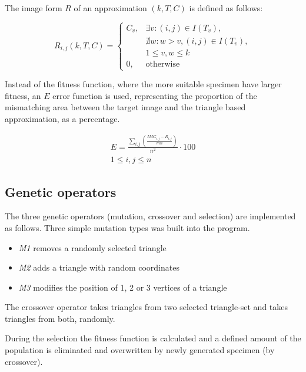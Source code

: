 \documentclass[conference]{IEEEtran}
\begin{document}
The image form $R$ of an approximation $(k, T, C)$ is defined as follows:

\begin{equation}
	R_{i,j}(k, T, C)=
	\begin{cases}
		C_v,& \exists v: (i, j) \in I(T_v),\\
		    & \nexists w: w>v, (i, j) \in I(T_v),\\
				&1 \leq v, w \leq k\\
		0,  & \text{otherwise}
	\end{cases}
\end{equation}

Instead of the fitness function, where the more suitable
specimen have larger fitness, an $E$ error function is used, representing
the proportion of the mismatching area between the target image and the triangle
based approximation, as a percentage.

\begin{equation}
	\begin{gathered}
		E = \frac{\sum_{i,j} \left( \frac{IMG_{i,j}-R_{i,j}}{mn} \right)}{n^2}\cdot 100\\
		1 \leq i,j \leq n
	\end{gathered}
\end{equation}

\subsection{Genetic operators}

The three genetic operators (mutation, crossover and selection)
are implemented as follows. Three simple mutation types was
built into the program.

\begin{itemize}

	\item{\emph{M1} removes a randomly selected triangle}

	\item{\emph{M2} adds a triangle with random coordinates}

	\item{\emph{M3} modifies the position of 1, 2 or 3 vertices of a triangle}

\end{itemize}

The crossover operator takes triangles from two selected triangle-set
and takes triangles from both, randomly.

During the selection the fitness function is calculated and a defined
amount of the population is eliminated and overwritten by
newly generated specimen (by crossover).
\end{document}
